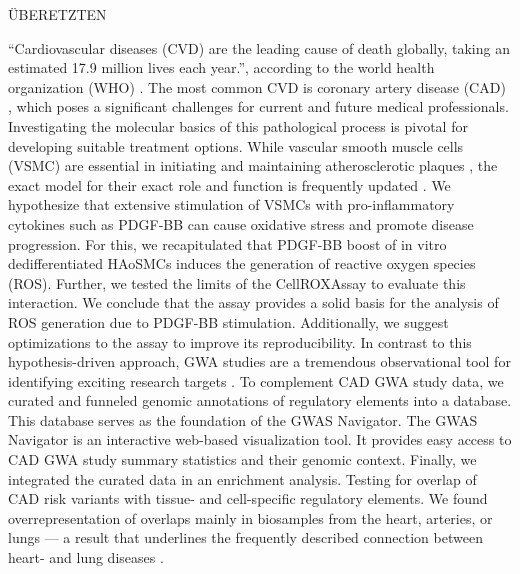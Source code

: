 {\Large ÜBERETZTEN}

“Cardiovascular diseases (CVD) are the leading cause of death globally, taking an estimated 17.9 million lives each year.”, according to the world health organization (WHO) \cite{whoCardiovascularDiseases2022}. The most common CVD is coronary artery disease (CAD) \cite{centersfordiseasecontrolandpreventionHeartDiseaseFacts2022}, which poses a significant challenges for current and future medical professionals. Investigating the molecular basics of this pathological process is pivotal for developing suitable treatment options.
While vascular smooth muscle cells (VSMC) are essential in initiating and maintaining atherosclerotic plaques \cite{doranRoleSmoothMuscle2008}, the exact model for their exact role and function is frequently updated \cite{liuSmoothMuscleCell2019, grootaertVascularSmoothMuscle2021, yapSixShadesVascular2021}. We hypothesize that extensive stimulation of VSMCs with pro-inflammatory cytokines such as PDGF-BB can cause oxidative stress and promote disease progression.
For this, we recapitulated that PDGF-BB boost of in vitro dedifferentiated HAoSMCs induces the generation of reactive oxygen species (ROS). Further, we tested the limits of the CellROX\texttrademark Assay to evaluate this interaction. We conclude that the assay provides a solid basis for the analysis of ROS generation due to PDGF-BB stimulation. Additionally, we suggest optimizations to the assay to improve its reproducibility.
In contrast to this hypothesis-driven approach, GWA studies are a tremendous observational tool for identifying exciting research targets \cite{uffelmannGenomewideAssociationStudies2021}.
To complement CAD GWA study data, we curated and funneled genomic annotations of regulatory elements into a database. This database serves as the foundation of the GWAS Navigator. The GWAS Navigator is an interactive web-based visualization tool. It provides easy access to CAD GWA study summary statistics and their genomic context.
Finally, we integrated the curated data in an enrichment analysis. Testing for overlap of CAD risk variants with tissue- and cell-specific regulatory elements. We found overrepresentation of overlaps mainly in biosamples from the heart, arteries, or lungs — a result that underlines the frequently described connection between heart- and lung diseases \cite{carterAssociationCardiovascularDisease2019, nowakLungFunctionCoronary2018, hanPulmonaryDiseasesHeart2007}.
